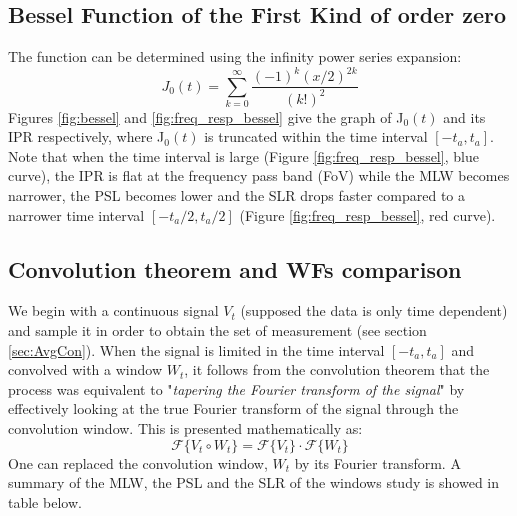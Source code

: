 \documentclass[useAMS,usenatbib]{mn2e}
\begin{document}
\subsection{Bessel Function of the First Kind of order zero}
 The function can  be determined using the infinity power series expansion:
\begin{equation}
J_0(t) = \sum_{k=0}^{\infty}\frac{(-1)^k (x/2)^{2k}}{(k!)^2}
\end{equation}
 Figures \ref{fig:bessel} and  \ref{fig:freq_resp_bessel} give the graph of J$_0(t)$ and its IPR respectively, where 
J$_0(t)$ is truncated within the time interval $[-t_a,t_a]$. Note that when the time interval is large 
(Figure \ref{fig:freq_resp_bessel}, blue curve), the IPR is flat at the frequency pass band (FoV) while the MLW becomes narrower,  the PSL 
becomes lower and the SLR drops faster compared to a narrower time interval $[-t_a/2,t_a/2]$ (Figure \ref{fig:freq_resp_bessel}, red curve).
\subsection{Convolution theorem and WFs comparison}
We begin with a continuous signal $V_{t}$ (supposed the data is only time dependent) and sample it in order to obtain the set of 
measurement (see section \ref{sec:AvgCon}). When the signal is limited in the time interval $[-t_a,t_a]$ and convolved with a window 
$W_{t}$, it 
follows from the convolution theorem that the process was equivalent to "\textit{tapering the  Fourier transform of the signal}" by 
effectively looking at the true Fourier transform of the signal through the convolution window. This is presented mathematically as:
\begin{equation}
\mathcal{F}\Big\{V_{t}\circ W_{t}\Big\} = \mathcal{F}\Big\{V_{t}\Big\}\cdot \mathcal{F}\Big\{W_{t}\Big\}
\end{equation}
One can replaced the convolution window, $W_{t}$ by its Fourier transform. A summary of the MLW, the PSL and 
the SLR of the windows study is showed in table below.
\end{document}
